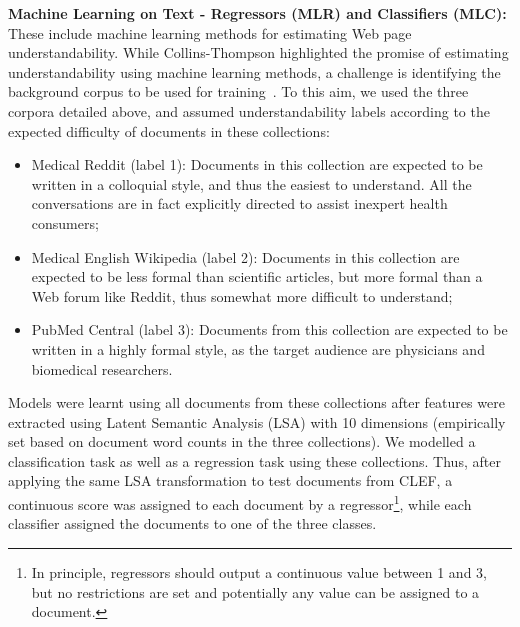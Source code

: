 


\textbf{Machine Learning on Text - Regressors (MLR) and Classifiers (MLC):} These include machine learning methods for estimating Web page understandability. While Collins-Thompson highlighted the promise of estimating understandability using machine learning methods, a challenge is identifying the background corpus to be used for training~\cite{collins2014computational}. To this aim, we used the three corpora detailed above, and assumed understandability labels according to the expected difficulty of documents in these collections:

\begin{itemize}[leftmargin=*]
    \item Medical Reddit (label 1): Documents in this collection are expected to be written in a colloquial style, and thus the easiest to understand. All the conversations are in fact explicitly directed to assist inexpert health consumers;
    \item Medical English Wikipedia (label 2): Documents in this collection are expected to be less formal than scientific articles, but more formal than a Web forum like Reddit, thus somewhat more difficult to understand;
    \item PubMed Central (label 3): Documents from this collection are expected to be written in a highly formal style, as the target audience are physicians and biomedical researchers.
\end{itemize}

Models were learnt using all documents from these collections after features were extracted using Latent Semantic Analysis (LSA) with 10 dimensions (empirically set based on document word counts in the three collections). We modelled a classification task as well as a regression task using these collections. Thus, after applying the same LSA transformation to test documents from CLEF, a continuous score was assigned to each document by a regressor\footnote{In principle, regressors should output a continuous value between 1 and 3, but no restrictions are set and potentially any value can be assigned to a document.}, while each classifier assigned the documents to one of the three classes.





